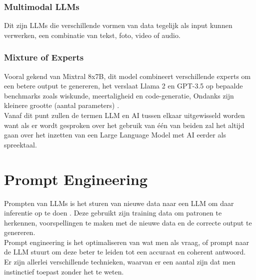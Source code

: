 \subsubsection{Multimodal LLMs}
\label{sssec:multimodalllms}
Dit zijn LLMs die verschillende vormen van data tegelijk als input kunnen verwerken, een combinatie van tekst, foto, video of audio.

\subsubsection{Mixture of Experts}
\label{sssec:mixtureofexperts}
Vooral gekend van Mixtral 8x7B, dit model combineert verschillende experts om een betere output te genereren, het verslaat Llama 2 en GPT-3.5 op bepaalde benchmarks zoals wiskunde, meertaligheid en code-generatie, Ondanks zijn kleinere grootte (aantal parameters) \autocite{jiang2024}. \\

Vanaf dit punt zullen de termen LLM en AI tussen elkaar uitgewisseld worden want als er wordt gesproken over het gebruik van één van beiden zal het altijd gaan over het inzetten van een Large Language Model met AI eerder als spreektaal.

\section{Prompt Engineering}
\label{sec:promptengineering}

Prompten van LLMs is het sturen van nieuwe data naar een LLM om daar inferentie op te doen \autocite{Bergmannb}. Deze gebruikt zijn training data om patronen te herkennen, voorspellingen te maken met de nieuwe data en de correcte output te genereren. \\

Prompt engineering is het optimaliseren van wat men als vraag, of prompt naar de LLM stuurt om deze beter te leiden tot een accuraat en coherent antwoord. \\

Er zijn allerlei verschillende technieken, waarvan er een aantal zijn dat men instinctief toepast zonder het te weten. \\

